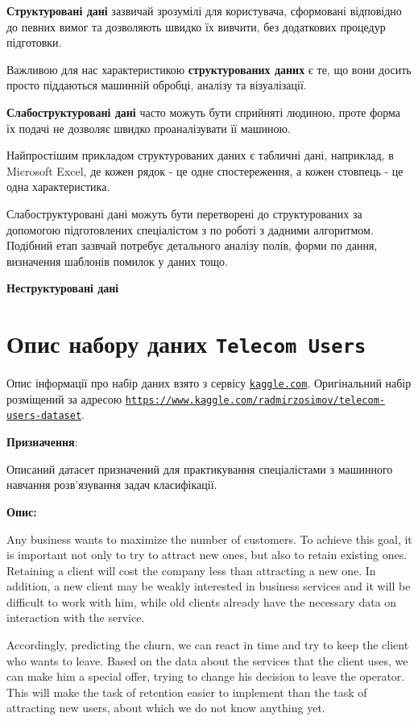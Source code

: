 \documentclass[
]{book}
\begin{document}
\textbf{Структуровані дані} зазвичай зрозумілі для користувача, сформовані відповідно до певних вимог та дозволяють швидко їх вивчити, без додаткових процедур підготовки.

Важливою для нас характеристикою \textbf{структурованих даних} є те, що вони досить просто піддаються машинній обробці, аналізу та візуалізації.

\textbf{Слабоструктуровані дані} часто можуть бути сприйняті людиною, проте форма їх подачі не дозволяє швидко проаналізувати її машиною.

Найпростішим прикладом структурованих даних є табличні дані, наприклад, в Microsoft Excel, де кожен рядок - це одне спостереження, а кожен стовпець - це одна характеристика.

Слабоструктуровані дані можуть бути перетворені до структурованих за допомогою підготовлених спеціалістом з по роботі з дадними алгоритмом. Подібний етап зазвчай потребує детального аналізу полів, форми по дання, визначення шаблонів помилок у даних тощо.

\textbf{Неструктуровані дані}

\hypertarget{chapter42}{%
\section{\texorpdfstring{Опис набору даних \texttt{Telecom\ Users}}{Опис набору даних Telecom Users}}\label{chapter42}}

Опис інформації про набір даних взято з сервісу \href{https://kaggle.com}{\texttt{kaggle.com}}.
Оригінальний набір розміщений за адресою \href{https://www.kaggle.com/radmirzosimov/telecom-users-dataset}{\texttt{https://www.kaggle.com/radmirzosimov/telecom-users-dataset}}.

\textbf{Призначення}:

Описаний датасет призначений для практикування спеціалістами з машинного навчання розв'язування задач класифікації.

\textbf{Опис:}

Any business wants to maximize the number of customers. To achieve this goal, it is important not only to try to attract new ones, but also to retain existing ones. Retaining a client will cost the company less than attracting a new one. In addition, a new client may be weakly interested in business services and it will be difficult to work with him, while old clients already have the necessary data on interaction with the service.

Accordingly, predicting the churn, we can react in time and try to keep the client who wants to leave. Based on the data about the services that the client uses, we can make him a special offer, trying to change his decision to leave the operator. This will make the task of retention easier to implement than the task of attracting new users, about which we do not know anything yet.
\end{document}
